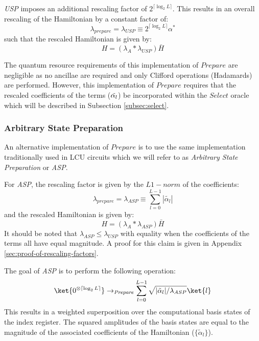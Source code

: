 \textit{USP} imposes an additional rescaling factor of $2^{\lceil \log_2{L} \rceil}$.
This results in an overall rescaling of the Hamiltonian by a constant factor of:
\begin{equation}
    \label{eq:usp-rescaling}
    \lambda_{prepare} = \lambda_{USP} \equiv 2^{\lceil \log_2{L} \rceil} \alpha^*
\end{equation}
such that the rescaled Hamiltonian is given by:
\begin{equation}
    \label{Hbar scale}
    H = (\lambda_A * \lambda_{USP}) \bar{H}
\end{equation}

The quantum resource requirements of this implementation of $\textit{Prepare}$ are negligible as no ancillae are required and only Clifford operations (Hadamards) are performed.
However, this implementation of $\textit{Prepare}$ requires that the rescaled coefficients of the terms ($\Tilde{\alpha_l}$) be incorporated within the $\textit{Select}$ oracle which will be described in Subsection \ref{subsec:select}.

\subsubsection{Arbitrary State Preparation}
\label{subsubsec:asp}

An alternative implementation of $\textit{Prepare}$ is to use the same implementation traditionally used in LCU circuits which we will refer to as \textit{Arbitrary State Preparation} or \textit{ASP}.

For \textit{ASP}, the rescaling factor is given by the $L1-norm$ of the coefficients:
\begin{equation}
    \label{eq:asp-scale}
    \lambda_{prepare} = \lambda_{ASP} \equiv \sum_{l=0}^{L-1} | \tilde{\alpha_l} |
\end{equation}
and the rescaled Hamiltonian is given by:
\begin{equation}
    H = (\lambda_A * \lambda_{ASP}) \bar{H}
\end{equation}
It should be noted that $\lambda_{ASP} \leq \lambda_{USP}$ with equality when the coefficients of the terms all have equal magnitude.
A proof for this claim is given in Appendix \ref{sec:proof-of-rescaling-factors}.

The goal of \textit{ASP} is to perform the following operation:
\begin{equation}
    \ket{0^{\otimes \lceil \log_2{L} \rceil}} \rightarrow_{\textit{Prepare}} \sum_{l = 0}^{L-1} \sqrt{|\tilde{\alpha}_l| / \lambda_{ASP}} \ket{l}
\end{equation}
This results in a weighted superposition over the computational basis states of the index register.
The squared amplitudes of the basis states are equal to the magnitude of the associated coefficients of the Hamiltonian ($\{\tilde{\alpha}_l\}$).



